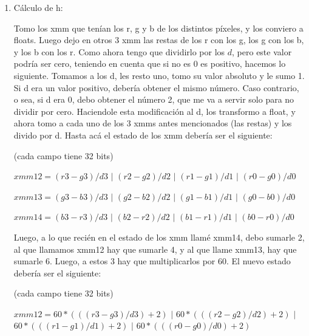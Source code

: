 \documentclass[a4paper]{article}
\begin{document}
\begin{enumerate}
	\item Cálculo de h:

	Tomo los xmm que tenían los r, g y b de los distintos píxeles, y los conviero a floats. Luego dejo en otros 3 xmm las restas de los r con los g, los g con los b, y los b con los r. Como ahora tengo que dividirlo por los $d$, pero este valor podría ser cero, teniendo en cuenta que si no es 0 es positivo, hacemos lo siguiente. Tomamos a los d, les resto uno, tomo su valor absoluto y le sumo 1. Si d era un valor positivo, debería obtener el mismo número. Caso contrario, o sea, si d era 0, debo obtener el número 2, que me va a servir solo para no dividir por cero. Haciendole esta modificación al d, los transformo a float, y ahora tomo a cada uno de los 3 xmms antes mencionados (las restas) y los divido por d. Hasta acá el estado de los xmm debería ser el siguiente:
	
\vspace*{0.3cm}

(cada campo tiene 32 bits)	
	
\vspace*{0.3cm}	

$xmm12=(r3-g3)/d3$ $|$ $(r2-g2)/d2$ $|$ $(r1-g1)/d1$ $|$ $(r0-g0)/d0$

\vspace*{0.3cm} 
 
$xmm13=(g3-b3)/d3$ $|$ $(g2-b2)/d2$ $|$ $(g1-b1)/d1$ $|$ $(g0-b0)/d0$

\vspace*{0.3cm}

$xmm14=(b3-r3)/d3$ $|$ $(b2-r2)/d2$ $|$ $(b1-r1)/d1$ $|$ $(b0-r0)/d0$	
	
\vspace*{0.3cm}
	
	Luego, a lo que recién en el estado de los xmm llamé xmm14, debo sumarle 2, al que llamamos xmm12 hay que sumarle 4, y al que llame xmm13, hay que sumarle 6. Luego, a estos 3 hay que multiplicarlos por 60. El nuevo estado debería ser el siguiente:
	
\vspace*{0.3cm}

(cada campo tiene 32 bits)	
	
\vspace*{0.3cm}	

$xmm12=60*(((r3-g3)/d3)+2)$ $|$ $60*(((r2-g2)/d2)+2)$ $|$ $60*(((r1-g1)/d1)+2)$ $|$ $60*(((r0-g0)/d0)+2)$

\vspace*{0.3cm} 
 

\end{enumerate}
\end{document}

